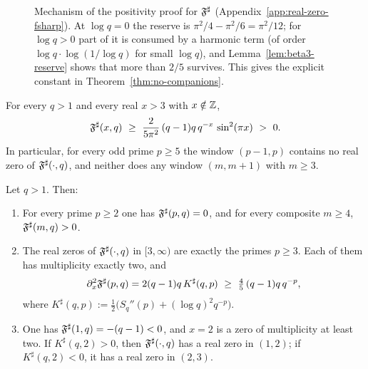 \begin{figure}[!htbp]
\centering
\setlength{\fboxsep}{6pt}
\caption{Mechanism of the positivity proof for $\mathfrak F^{\sharp}$ (Appendix~\ref{app:real-zero-fsharp}). At $\log q=0$ the reserve is $\pi^2/4-\pi^2/6=\pi^2/12$; for $\log q>0$ part of it is consumed by a harmonic term (of order $\log q\cdot\log(1/\log q)$ for small $\log q$), and Lemma~\ref{lem:beta3-reserve} shows that more than $2/5$ survives. This gives the explicit constant in Theorem~\ref{thm:no-companions}.}
\label{fig:positivity-mechanism}
\end{figure}

\FloatBarrier

\begin{theorem}\label{thm:no-companions}
For every $q>1$ and every real $x>3$ with $x\notin\mathbb{Z}$,
\[
\Fsharp(x,q)\ \ge\ \frac{2}{5\pi^2}\,(q-1)q\,q^{-x}\,\sin^2(\pi x)\ >\ 0 .
\]
In particular, for every odd prime $p\ge5$ the window $(p-1,p)$ contains no real zero of $\mathfrak F^{\sharp}(\cdot,q)$, and neither does any window $(m,m+1)$ with $m\ge3$.
\end{theorem}

\begin{theorem}\label{thm:real-zero-structure}
Let $q>1$. Then:
\begin{enumerate}
  \item For every prime $p\ge2$ one has $\mathfrak F^{\sharp}(p,q)=0$, and for every composite $m\ge4$, $\mathfrak F^{\sharp}(m,q)>0$.
  \item The real zeros of $\mathfrak F^{\sharp}(\cdot,q)$ in $[3,\infty)$ are exactly the primes $p\ge3$. Each of them has multiplicity exactly two, and
  \[
  \partial_x^2\Fsharp(p,q)=2(q-1)q\,K^\sharp(q,p)\ \ge\ \tfrac45\,(q-1)q\,q^{-p},
  \]
  where $K^\sharp(q,p):=\tfrac12\bigl(S_q''(p)+(\log q)^2q^{-p}\bigr)$.
  \item One has $\mathfrak F^{\sharp}(1,q)=-(q-1)<0$, and $x=2$ is a zero of multiplicity at least two. If $K^\sharp(q,2)>0$, then $\mathfrak F^{\sharp}(\cdot,q)$ has a real zero in $(1,2)$; if $K^\sharp(q,2)<0$, it has a real zero in $(2,3)$.
\end{enumerate}
\end{theorem}

